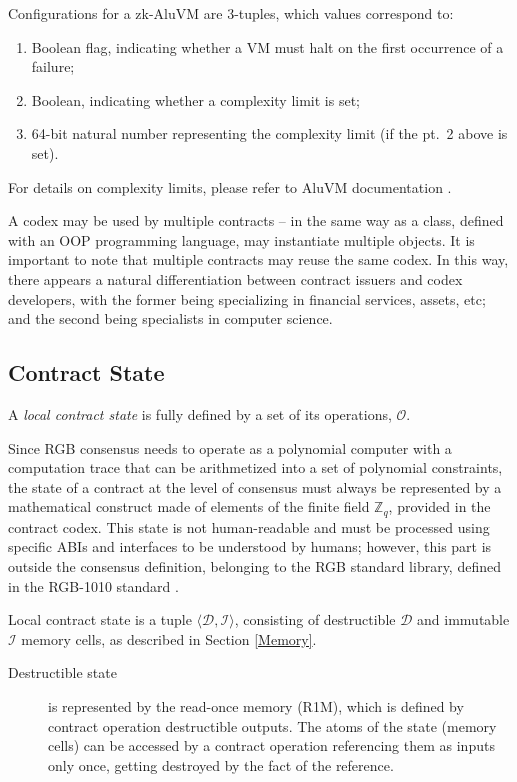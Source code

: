 \documentclass[9pt,oneside]{amsart}
\begin{document}
\begin{multicols}{2}


Configurations for a zk-AluVM are 3-tuples, which values correspond to:
\begin{enumerate}
\item Boolean flag, indicating whether a VM must halt on the first occurrence of a failure;
\item Boolean, indicating whether a complexity limit is set;
\item 64-bit natural number representing the complexity limit (if the pt.~2 above is set).
\end{enumerate}

For details on complexity limits, please refer to AluVM documentation \cite{AluVM}.

A codex may be used by multiple contracts – in the same way as a class,
defined with an OOP programming language, may instantiate multiple objects.
It is important to note that multiple contracts may reuse the same codex.
In this way, there appears a natural differentiation between contract issuers and codex developers,
with the former being specializing in financial services, assets, etc;
and the second being specialists in computer science.


\subsection{Contract State}

A \emph{local contract state} is fully defined by a set of its operations, $\mathcal{O}$.

Since RGB consensus needs to operate as a polynomial computer
with a computation trace that can be arithmetized into a set of polynomial constraints,
the state of a contract at the level of consensus must always be represented
by a mathematical construct made of elements of the finite field $\mathbb{Z}_q$,
provided in the contract codex.
This state is not human-readable and must be processed using specific ABIs and interfaces
to be understood by humans; however, this part is outside the consensus definition,
belonging to the RGB standard library, defined in the RGB-1010 standard \cite{RGB1010}.

Local contract state is a tuple $\langle \mathcal{D}, \mathcal{I} \rangle$,
consisting of destructible $\mathcal{D}$ and immutable $\mathcal{I}$ memory cells,
as described in Section \ref{Memory}.

\begin{description}
\item[Destructible state] is represented by the \gls{read-once memory} (R1M),
  which is defined by contract operation destructible outputs.
  The atoms of the state (memory cells) can be accessed by a contract operation
  referencing them as inputs only once, getting destroyed by the fact of the reference.


\end{description}
\end{multicols}
\end{document}
